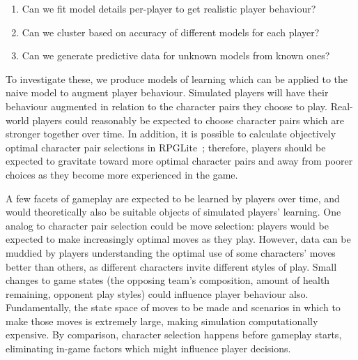 \begin{enumerate}
  \item Can we fit model details per-player to get realistic player behaviour?
  \item Can we cluster based on accuracy of different models for each player?
  \item Can we generate predictive data for unknown models from known ones?
\end{enumerate}

To investigate these, we produce models of learning which can be applied to the
naive model to augment player behaviour. Simulated players will have their
behaviour augmented in relation to the character pairs they choose to play.
Real-world players could reasonably be expected to choose character pairs which
are stronger together over time. In addition, it is possible to calculate
objectively optimal character pair selections in RPGLite~\cite{kavanagh2021thesis};
therefore, players should be expected to gravitate toward more optimal character
pairs and away from poorer choices as they become more experienced in the game.

A few facets of gameplay are expected to be learned by players over time, and
would theoretically also be suitable objects of simulated players' learning. One
analog to character pair selection could be move selection: players would be
expected to make increasingly optimal moves as they play. However, data can be
muddied by players understanding the optimal use of some characters' moves
better than others, as different characters invite different styles of play.
Small changes to game states (the opposing team's composition, amount of health
remaining, opponent play styles) could influence player behaviour also.
Fundamentally, the state space of moves to be made and scenarios in which to
make those moves is extremely large, making simulation computationally
expensive. By comparison, character selection happens before gameplay starts,
eliminating in-game factors which might influence player decisions.

